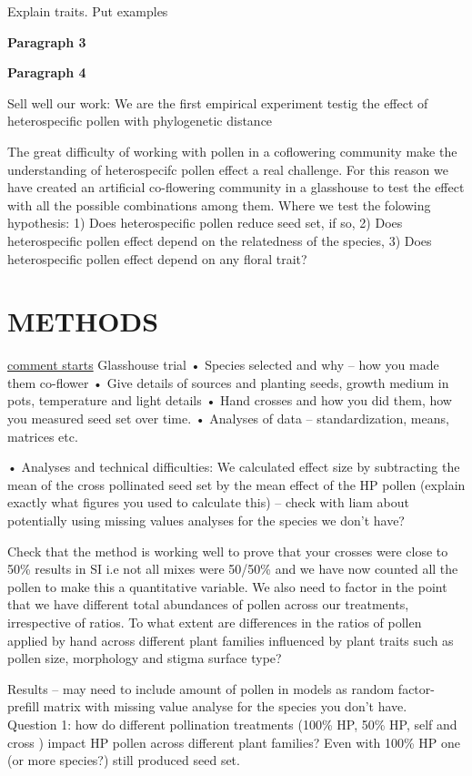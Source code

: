 \documentclass[11pt,a4paper]{article}
\begin{document}
Explain traits. Put examples

\textbf{Paragraph 3}

\textbf{Paragraph 4}

Sell well our work: We are the first empirical experiment testig the
effect of heterospecific pollen with phylogenetic distance

The great difficulty of working with pollen in a coflowering community
make the understanding of heterospecifc pollen effect a real challenge.
For this reason we have created an artificial co-flowering community in
a glasshouse to test the effect with all the possible combinations among
them. Where we test the folowing hypothesis: 1) Does heterospecific
pollen reduce seed set, if so, 2) Does heterospecific pollen effect
depend on the relatedness of the species, 3) Does heterospecific pollen
effect depend on any floral trait?

\section{METHODS}\label{methods}

\href{}{comment starts} Glasshouse trial • Species selected and why --
how you made them co-flower • Give details of sources and planting
seeds, growth medium in pots, temperature and light details • Hand
crosses and how you did them, how you measured seed set over time. •
Analyses of data -- standardization, means, matrices etc.

• Analyses and technical difficulties: We calculated effect size by
subtracting the mean of the cross pollinated seed set by the mean effect
of the HP pollen (explain exactly what figures you used to calculate
this) -- check with liam about potentially using missing values analyses
for the species we don't have?

Check that the method is working well to prove that your crosses were
close to 50\% results in SI i.e not all mixes were 50/50\% and we have
now counted all the pollen to make this a quantitative variable. We also
need to factor in the point that we have different total abundances of
pollen across our treatments, irrespective of ratios. To what extent are
differences in the ratios of pollen applied by hand across different
plant families influenced by plant traits such as pollen size,
morphology and stigma surface type?

Results -- may need to include amount of pollen in models as random
factor- prefill matrix with missing value analyse for the species you
don't have.\\
Question 1: how do different pollination treatments (100\% HP, 50\% HP,
self and cross ) impact HP pollen across different plant families? Even
with 100\% HP one (or more species?) still produced seed set.
\end{document}

